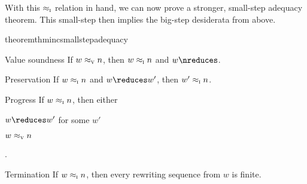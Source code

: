 With this $ \approx\sb{\text{\normalfont\scshape i}} $ relation in hand, we can now prove a stronger, small-step adequacy theorem.
This small-step  then implies the big-step desiderata from above.
%
\begin{restatable}[
  name=Small-step adequacy of increments,
  label=thm:string-rewriting:inc-small-step-adequacy
]{theorem}{thmincsmallstepadequacy}
  \leavevmode
  \begin{thinthmdescription}
  \item[Value soundness]
    If $w \approx\sb{\text{\normalfont\scshape v}} n$, then $w \approx\sb{\text{\normalfont\scshape i}} n$ and $w \nreduces$.
  \item[Preservation]
    If $w \approx\sb{\text{\normalfont\scshape i}} n$ and $w \reduces w'$, then $w' \approx\sb{\text{\normalfont\scshape i}} n$.
  \item[Progress]
    If $w \approx\sb{\text{\normalfont\scshape i}} n$, then either
    \begin{itemize*}[
      label=, afterlabel=,
      before=\unskip:\space,
      itemjoin=;\space, itemjoin*=; or\space%
    ]
    \item $w \reduces w'$ for some $w'$
    \item $w \approx\sb{\text{\normalfont\scshape v}} n$%
    \end{itemize*}.
  \item[Termination]
    If $w \approx\sb{\text{\normalfont\scshape i}} n$, then every rewriting sequence from $w$ is finite.
  \end{thinthmdescription}
\end{restatable}
%
